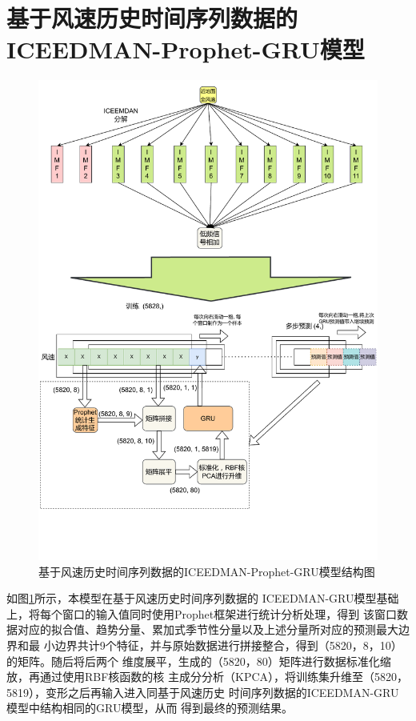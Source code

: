 \documentclass[AutoFakeBold]{LZUThesis}
\begin{document}
\section{基于风速历史时间序列数据的ICEEDMAN-Prophet-GRU模型}
\begin{figure}[H]
	\centering
    \includegraphics[width=1\textwidth]{figures/ICEEMDAN-Prophet-GRU-Wind.pdf}
    \caption{基于风速历史时间序列数据的ICEEDMAN-Prophet-GRU模型结构图}
    \label{fig_ICEEMDAN_Prophet_GRU_Wind}
\end{figure}

如图\ref{fig_ICEEMDAN_Prophet_GRU_Wind}所示，本模型在基于风速历史时间序列数据的
ICEEDMAN-GRU模型基础上，将每个窗口的输入值同时使用Prophet框架进行统计分析处理，得到
该窗口数据对应的拟合值、趋势分量、累加式季节性分量以及上述分量所对应的预测最大边界和最
小边界共计9个特征，并与原始数据进行拼接整合，得到（5820，8，10）的矩阵。随后将后两个
维度展平，生成的（5820，80）矩阵进行数据标准化缩放，再通过使用RBF核函数的核
主成分分析（KPCA），将训练集升维至（5820，5819），变形之后再输入进入同基于风速历史
时间序列数据的ICEEDMAN-GRU模型中结构相同的GRU模型，从而
得到最终的预测结果。
\end{document}
